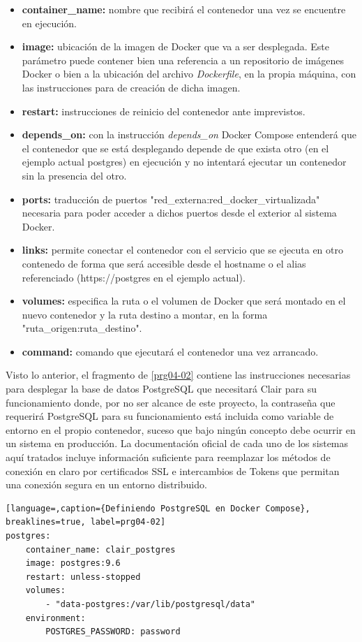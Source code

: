 \begin{itemize}
	\item \textbf{container\_name:} nombre que recibirá el contenedor una vez se encuentre en ejecución.
	\item \textbf{image:} ubicación de la imagen de Docker que va a ser desplegada. Este parámetro puede contener bien una referencia a un repositorio de imágenes Docker o bien a la ubicación del archivo \textit{Dockerfile}, en la propia máquina, con las instrucciones para de creación de dicha imagen.
	\item \textbf{restart:} instrucciones de reinicio del contenedor ante imprevistos.
	\item \textbf{depends\_on:} con la instrucción \textit{depends\_on} Docker Compose entenderá que el contenedor que se está desplegando depende de que exista otro (en el ejemplo actual postgres) en ejecución y no intentará ejecutar un contenedor sin la presencia del otro.
	\item \textbf{ports:} traducción de puertos "red\_externa:red\_docker\_virtualizada" necesaria para poder acceder a dichos puertos desde el exterior al sistema Docker.
	\item \textbf{links:} permite conectar el contenedor con el servicio que se ejecuta en otro contenedo de forma que será accesible desde el hostname o el alias referenciado (https://postgres en el ejemplo actual).
	\item \textbf{volumes:} especifica la ruta o el volumen de Docker que será montado en el nuevo contenedor y la ruta destino a montar, en la forma "ruta\_origen:ruta\_destino".
	\item \textbf{command:} comando que ejecutará el contenedor una vez arrancado.
\end{itemize}

Visto lo anterior, el fragmento de \autoref{prg04-02} contiene las instrucciones necesarias para desplegar la base de datos PostgreSQL que necesitará Clair para su funcionamiento donde, por no ser alcance de este proyecto, la contraseña que requerirá PostgreSQL para su funcionamiento está incluida como variable de entorno en el propio contenedor, suceso que bajo ningún concepto debe ocurrir en un sistema en producción. La documentación oficial de cada uno de los sistemas aquí tratados incluye información suficiente para reemplazar los métodos de conexión en claro por certificados SSL e intercambios de Tokens que permitan una conexión segura en un entorno distribuido.

\begin{lstlisting}[language=,caption={Definiendo PostgreSQL en Docker Compose}, breaklines=true, label=prg04-02]
postgres:
	container_name: clair_postgres
	image: postgres:9.6
	restart: unless-stopped
	volumes:
		- "data-postgres:/var/lib/postgresql/data"
	environment:
		POSTGRES_PASSWORD: password
\end{lstlisting}

